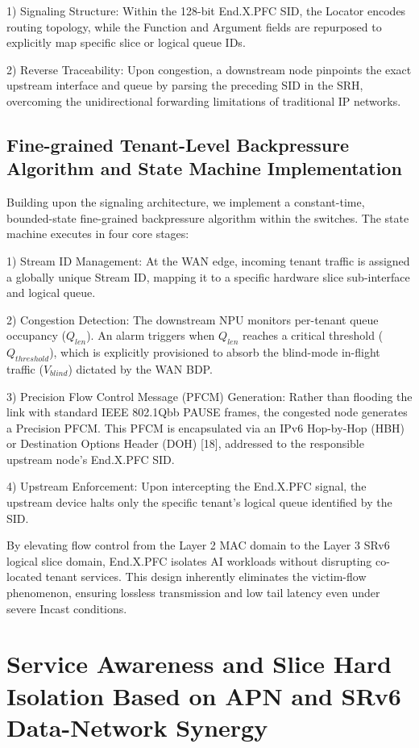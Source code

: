 \documentclass[a4paper]{jpconf}
\begin{document}
1) Signaling Structure: Within the 128-bit End.X.PFC SID, the Locator encodes routing topology, while the Function and Argument fields are repurposed to explicitly map specific slice or logical queue IDs.


2) Reverse Traceability: Upon congestion, a downstream node pinpoints the exact upstream interface and queue by parsing the preceding SID in the SRH, overcoming the unidirectional forwarding limitations of traditional IP networks.


\subsection{Fine-grained Tenant-Level Backpressure Algorithm and State Machine Implementation}


Building upon the signaling architecture, we implement a constant-time, bounded-state fine-grained backpressure algorithm within the switches. The state machine executes in four core stages:


1) Stream ID Management: At the WAN edge, incoming tenant traffic is assigned a globally unique Stream ID, mapping it to a specific hardware slice sub-interface and logical queue.


2) Congestion Detection: The downstream NPU monitors per-tenant queue occupancy ($Q_{len}$). An alarm triggers when $Q_{len}$ reaches a critical threshold ($Q_{threshold}$), which is explicitly provisioned to absorb the blind-mode in-flight traffic ($V_{blind}$) dictated by the WAN BDP.


3) Precision Flow Control Message (PFCM) Generation: Rather than flooding the link with standard IEEE 802.1Qbb PAUSE frames, the congested node generates a Precision PFCM. This PFCM is encapsulated via an IPv6 Hop-by-Hop (HBH) or Destination Options Header (DOH) [18], addressed to the responsible upstream node's End.X.PFC SID.


4) Upstream Enforcement: Upon intercepting the End.X.PFC signal, the upstream device halts only the specific tenant's logical queue identified by the SID.


By elevating flow control from the Layer 2 MAC domain to the Layer 3 SRv6 logical slice domain, End.X.PFC isolates AI workloads without disrupting co-located tenant services. This design inherently eliminates the victim-flow phenomenon, ensuring lossless transmission and low tail latency even under severe Incast conditions.


\section{Service Awareness and Slice Hard Isolation Based on APN and SRv6 Data-Network Synergy}
\end{document}
